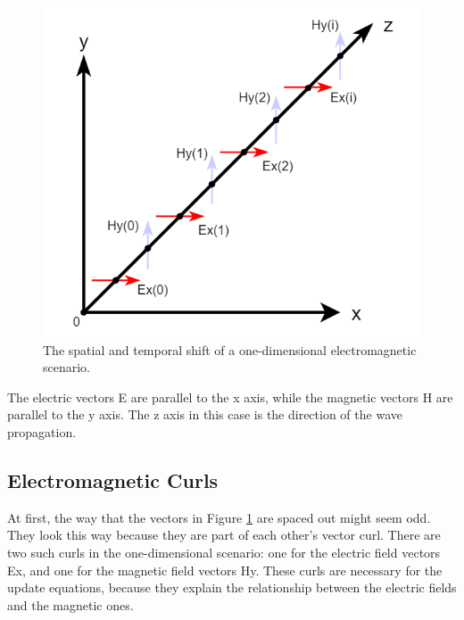 \begin{figure}
	\centering
	\includegraphics[scale=0.5]{Figures/fdtd1dDiscretized}
	\decoRule
	\caption[1D Spatial and Temporal Shift - TEM Mode]{The spatial and temporal shift of a one-dimensional electromagnetic scenario.}
	\label{fig:fdtd1dDiscretized}
\end{figure}

The electric vectors E are parallel to the x axis, while the magnetic vectors H are parallel to the y axis. The z axis in this case is the direction of the wave propagation.


\subsection{Electromagnetic Curls}

At first, the way that the vectors in Figure \ref{fig:fdtd1dDiscretized} are spaced out might seem odd. They look this way because they are part of each other's vector curl. There are two such curls in the one-dimensional scenario: one for the electric field vectors Ex, and one for the magnetic field vectors Hy. These curls are necessary for the update equations, because they explain the relationship between the electric fields and the magnetic ones.


